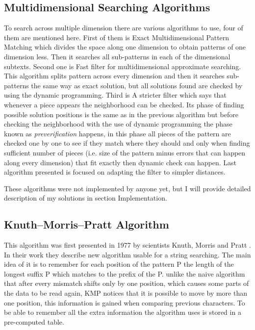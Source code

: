 \subsection{Multidimensional Searching Algorithms}
To search across multiple dimension there are various algorithms to use, four of them are mentioned here. First of them is Exact Multidimensional Pattern Matching which divides the space along one dimension to obtain patterns of one dimension less. Then it searches all sub-patterns in each of the dimensional subtexts.
Second one is Fast filter for multidimensional approximate searching. This algorithm splits pattern across every dimension and then it searches sub-patterns the same way as exact solution, but all solutions found are checked by using the dynamic programming. Third is A stricter filter which says that whenever a piece appears the neighborhood can be checked. Its phase of finding possible solution positions is the same as in the previous algorithm but before checking the neighborhood with the use of dynamic programming the phase known as \textit{preverification} happens, in this phase all pieces of the pattern are checked one by one to see if they match where they should and only when finding sufficient number of pieces (i.e. size of the pattern minus errors that can happen along every dimension) that fit exactly then dynamic check can happen. Last algorithm presented is focused on adapting the filter to simpler distances. \cite{mdApproxPM}

These algorithms were not implemented by anyone yet, but I will provide detailed description of my solutions in section Implementation.

\subsection{Knuth--Morris--Pratt Algorithm}
This algorithm was first presented in 1977 by scientists Knuth, Morris and Pratt \cite{kmp}. In their work they describe new algorithm usable for a string searching. The main idea of it is to remember for each position of the pattern P the length of the longest suffix P which matches to the prefix of the P. unlike the naive algorithm that after every mismatch shifts only by one position, which causes some parts of the data to be read again, KMP notices that it is possible to 
move by more than one position, this information is gained when comparing previous characters. To be able to remember all the extra information the algorithm uses is stored in a pre-computed table.


